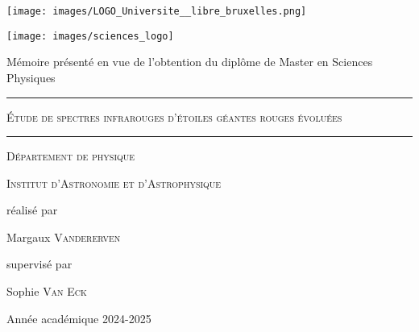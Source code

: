 \begin{titlepage}

\begin{minipage}{.3\textwidth}%
        \centering
        \texttt{[image: images/LOGO\_Universite\_\_libre\_bruxelles.png]}\par\vspace{0.2cm}
        \end{minipage}%
        \hfill
        \begin{minipage}{.25\textwidth}%
        \centering
        \texttt{[image: images/sciences\_logo]}\par\vspace{0.2cm}
        \end{minipage}%

\centering	\vspace{4cm}
	{\large Mémoire présenté en vue de l'obtention du diplôme de Master en
Sciences Physiques}\par\vspace{0.8cm}
	\rule{0.5\linewidth}{1pt}
	\vspace{0.8cm}\par 
	{\huge \textsc{Étude de spectres infrarouges d'étoiles géantes rouges évoluées} \par}
	\vspace{0.8cm}
	\rule{0.5\linewidth}{1pt}
	\vspace{1cm} \par 
	{\Large \textsc{Département de physique}} \par 
	{\Large \textsc{Institut d'Astronomie et d'Astrophysique}}\par\vspace{0.8cm}\vspace{3cm} \par 
	réalisé par\par
        {\large Margaux \textsc{Vandererven}\par \vspace{1cm} \par         
        }
		supervisé par\par
	\large Sophie \textsc{Van Eck}
	\vfill

	{\large Année académique 2024-2025 \par}

\end{titlepage}